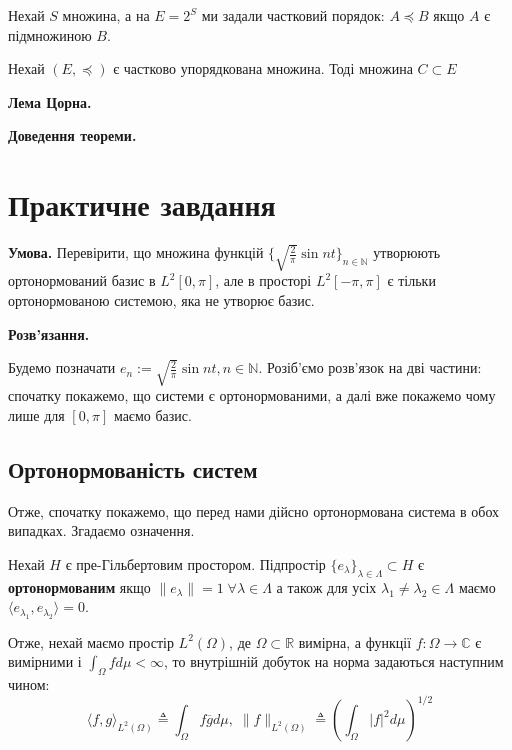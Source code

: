 \documentclass[14pt]{extarticle}
\newcommand{\<}{\langle}
\renewcommand{\>}{\rangle}
\theoremstyle{mystyle}{\newtheorem{definition}{Definition}[section]}
\theoremstyle{mystyle}{\newtheorem{proposition}[definition]{Proposition}}
\theoremstyle{mystyle}{\newtheorem{theorem}[definition]{Theorem}}
\theoremstyle{mystyle}{\newtheorem{lemma}[definition]{Lemma}}
\theoremstyle{mystyle}{\newtheorem{corollary}[definition]{Corollary}}
\theoremstyle{mystyle}{\newtheorem*{remark}{Remark}}
\theoremstyle{mystyle}{\newtheorem*{remarks}{Remarks}}
\theoremstyle{mystyle}{\newtheorem*{example}{Example}}
\theoremstyle{mystyle}{\newtheorem*{examples}{Examples}}
\theoremstyle{definition}{\newtheorem*{exercise}{Exercise}}
\theoremstyle{cstyle}{\newtheorem*{cthm}{}}
\theoremstyle{warn}
\begin{document}
\begin{example}
    Нехай $S$ множина, а на $E=2^S$ ми задали частковий порядок: $A \preceq B$ якщо $A$ є підмножиною $B$.
\end{example}

\begin{definition}
    Нехай $(E,\preceq)$ є частково упорядкована множина. Тоді множина $C \subset E$
\end{definition}

\begin{theorem}
    \textbf{Лема Цорна.} 
\end{theorem}

\textbf{Доведення теореми.} 

\section{Практичне завдання}

\textbf{Умова.} Перевірити, що множина функцій $\{\sqrt{\frac{2}{\pi}}\sin nt\}_{n \in \mathbb{N}}$ утворюють ортонормований базис в $L^2[0,\pi]$, але в просторі $L^2[-\pi,\pi]$ є тільки ортонормованою системою, яка не утворює базис.

\textbf{Розв'язання.} 

Будемо позначати $e_n := \sqrt{\frac{2}{\pi}}\sin nt, n \in \mathbb{N}$. Розіб'ємо розв'язок на дві частини: спочатку покажемо, що системи є ортонормованими, а далі вже покажемо чому лише для $[0,\pi]$ маємо базис.

\subsection{Ортонормованість систем}
Отже, спочатку покажемо, що перед нами дійсно ортонормована система в обох випадках. Згадаємо означення.

\begin{definition}
    Нехай $H$ є пре-Гільбертовим простором. Підпростір $\{e_{\lambda}\}_{\lambda \in \Lambda} \subset H$ є \textbf{ортонормованим} якщо $\|e_{\lambda}\|=1 \; \forall \lambda \in \Lambda$ а також для усіх $\lambda_1 \neq \lambda_2 \in \Lambda$ маємо $\langle e_{\lambda_1}, e_{\lambda_2} \rangle = 0$.
\end{definition}

Отже, нехай маємо простір $L^2(\Omega)$, де $\Omega \subset \mathbb{R}$ вимірна, а функції $f: \Omega \to \mathbb{C}$ є вимірними і $\int_{\Omega}fd\mu < \infty$, то внутрішній добуток на норма задаються наступним чином:
\begin{equation}
    \langle f,g \rangle_{L^2(\Omega)} \triangleq \int_{\Omega} f\overline{g}d\mu, \; \|f\|_{L^2(\Omega)} \triangleq \left(\int_{\Omega}|f|^2d\mu\right)^{1/2}
\end{equation}
\end{document}
